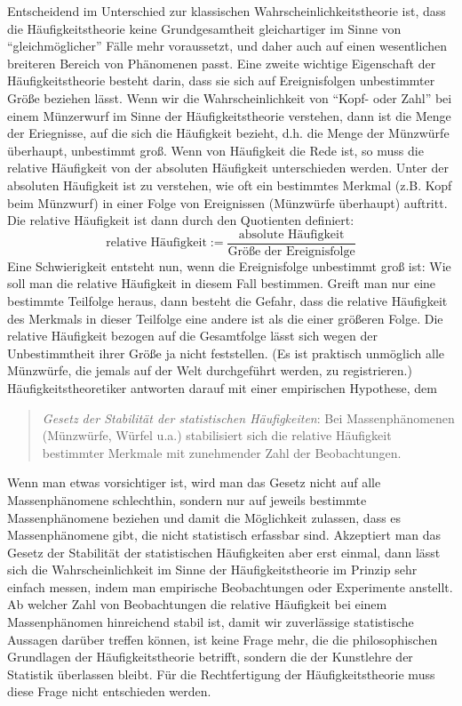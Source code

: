 Entscheidend im Unterschied zur klassischen Wahrscheinlichkeitstheorie ist, dass
die Häufigkeitstheorie keine Grundgesamtheit gleichartiger im Sinne von
"`gleichmöglicher"' Fälle mehr voraussetzt, und daher auch auf einen wesentlichen
breiteren Bereich von Phänomenen passt. Eine zweite wichtige Eigenschaft der
Häufigkeitstheorie besteht darin, dass sie sich auf Ereignisfolgen unbestimmter
Größe beziehen lässt. Wenn wir die Wahrscheinlichkeit von "`Kopf- oder Zahl"' bei
einem Münzerwurf im Sinne der Häufigkeitstheorie verstehen, dann ist die Menge der
Eriegnisse, auf die sich die Häufigkeit bezieht, d.h. die Menge der Münzwürfe
überhaupt, unbestimmt groß. Wenn von Häufigkeit die Rede ist, so muss die
relative Häufigkeit von der absoluten Häufigkeit unterschieden werden. Unter der
absoluten Häufigkeit ist zu verstehen, wie oft ein bestimmtes Merkmal (z.B. Kopf
beim Münzwurf) in einer Folge von Ereignissen (Münzwürfe überhaupt) auftritt. Die
relative Häufigkeit ist dann durch den Quotienten definiert: \[\mbox{relative
Häufigkeit} := \frac{\mbox{absolute Häufigkeit}}{\mbox{Größe der Ereignisfolge}}
\] Eine Schwierigkeit entsteht nun, wenn die Ereignisfolge unbestimmt groß ist:
Wie soll man die relative Häufigkeit in diesem Fall bestimmen. Greift man nur
eine bestimmte Teilfolge heraus, dann besteht die Gefahr, dass die relative
Häufigkeit des Merkmals in dieser Teilfolge eine andere ist als die einer
größeren Folge. Die relative Häufigkeit bezogen auf die Gesamtfolge lässt sich
wegen der Unbestimmtheit ihrer Größe ja nicht feststellen. (Es ist praktisch
unmöglich alle Münzwürfe, die jemals auf der Welt durchgeführt werden, zu
registrieren.) Häufigkeitstheoretiker antworten darauf mit einer empirischen
Hypothese, dem
\begin{quote}
{\em Gesetz der Stabilität der statistischen Häufigkeiten}: Bei
Massenphänomenen (Münzwürfe, Würfel u.a.) stabilisiert sich die relative
Häufigkeit bestimmter Merkmale mit zunehmender Zahl der
Beobachtungen.\cite[S. 92]{gillies:2000}
\end{quote}
Wenn man etwas vorsichtiger ist, wird man das Gesetz nicht auf alle
Massenphänomene schlechthin, sondern nur auf jeweils bestimmte Massenphänomene
beziehen und damit die Möglichkeit zulassen, dass es Massenphänomene gibt, die
nicht statistisch erfassbar sind. Akzeptiert man das Gesetz der Stabilität der 
statistischen Häufigkeiten aber erst einmal, dann lässt sich die
Wahrscheinlichkeit im Sinne der Häufigkeitstheorie im Prinzip sehr einfach messen, 
indem man empirische Beobachtungen oder Experimente anstellt. Ab welcher
Zahl von Beobachtungen die relative Häufigkeit bei einem Massenphänomen
hinreichend stabil ist, damit wir zuverlässige statistische Aussagen darüber
treffen können, ist keine Frage mehr, die die philosophischen 
Grundlagen der Häufigkeitstheorie betrifft,
sondern die der Kunstlehre der Statistik überlassen bleibt. Für die
Rechtfertigung der Häufigkeitstheorie muss diese Frage nicht entschieden
werden. 

